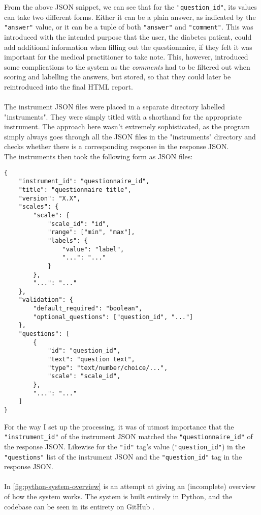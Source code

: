 \noindent
From the above JSON snippet, we can see that for the \texttt{"question_id"}, its values can take two different forms. Either it can be a plain answer, as indicated by the \texttt{"answer"} value, or it can be a tuple of both \texttt{"answer"} and \texttt{"comment"}. This was introduced with the intended purpose that the user, the diabetes patient, could add additional information when filling out the questionnaire, if they felt it was important for the medical practitioner to take note. This, however, introduced some complications to the system as the \emph{comments} had to be filtered out when scoring and labelling the answers, but stored, so that they could later be reintroduced into the final HTML report.
\\
\\
The instrument JSON files were placed in a separate directory labelled "instruments". They were simply titled with a shorthand for the appropriate instrument. The approach here wasn't extremely sophisticated, as the program simply always goes through all the JSON files in the "instruments" directory and checks whether there is a corresponding response in the response JSON.
\\
The instruments then took the following form as JSON files:
\begin{verbatim}
{
    "instrument_id": "questionnaire_id",
    "title": "questionnaire title",
    "version": "X.X",
    "scales": {
        "scale": {
            "scale_id": "id",
            "range": ["min", "max"],
            "labels": {
                "value": "label",
                "...": "..."
            }
        },
        "...": "..."
    },
    "validation": {
        "default_required": "boolean",
        "optional_questions": ["question_id", "..."]
    },
    "questions": [
        {
            "id": "question_id",
            "text": "question text",
            "type": "text/number/choice/...",
            "scale": "scale_id",
        },
        "...": "..."
    ]
}
\end{verbatim}

\noindent
For the way I set up the processing, it was of utmost importance that the \texttt{"instrument_id"} of the instrument JSON matched the \texttt{"questionnaire_id"} of the response JSON. Likewise for the \texttt{"id"} tag's value (\texttt{"question_id"}) in the \texttt{"questions"} list of the instrument JSON and the \texttt{"question_id"} tag in the response JSON.
\\
\\
In \autoref{fig:python-system-overview} is an attempt at giving an (incomplete) overview of how the system works. The system is built entirely in Python, and the codebase can be seen in its entirety on GitHub .

